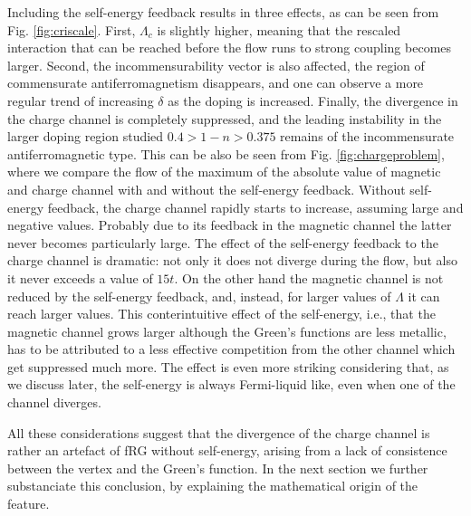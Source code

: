 Including the self-energy feedback results in three effects, as can be seen from Fig. \ref{fig:criscale}. 
First, $\Lambda_c$ is slightly higher, meaning that the rescaled interaction that can be reached before the flow runs to strong coupling becomes larger. 
Second, the incommensurability vector is also affected, the region of commensurate antiferromagnetism disappears, and one can observe a more regular trend of increasing $\delta$ as the doping is increased.
Finally, the divergence in the charge channel is completely suppressed, and the leading instability in the larger doping region studied  $0.4> 1-n>0.375$ remains of the incommensurate antiferromagnetic type. 
This can be also be seen from Fig. \ref{fig:chargeproblem}, where we compare the flow of the maximum of the absolute value of magnetic and charge channel with and without the self-energy feedback. Without self-energy feedback, the charge channel rapidly starts to increase, assuming large and negative values. Probably due to its feedback in the magnetic channel the latter never becomes particularly large.    
The effect of the self-energy feedback to the charge channel is dramatic: not only it does not diverge during the flow, but also it never exceeds a value of $15t$. On the other hand the magnetic channel is not reduced by the self-energy feedback, and, instead, for larger values of $\Lambda$ it can reach larger values. This conterintuitive effect of the self-energy, i.e., that the magnetic channel grows larger although the Green's functions are less metallic, has to be attributed to a less effective competition from the other channel which get suppressed much more. 
The effect is even more striking considering that, as we discuss later, the self-energy is always Fermi-liquid like, even when one of the channel diverges.

All these considerations suggest that the divergence of the charge channel is rather an artefact of fRG without self-energy, arising from a lack of consistence between the vertex and the Green's function. In the next section we further substanciate this conclusion, by explaining the mathematical origin of the feature. 


